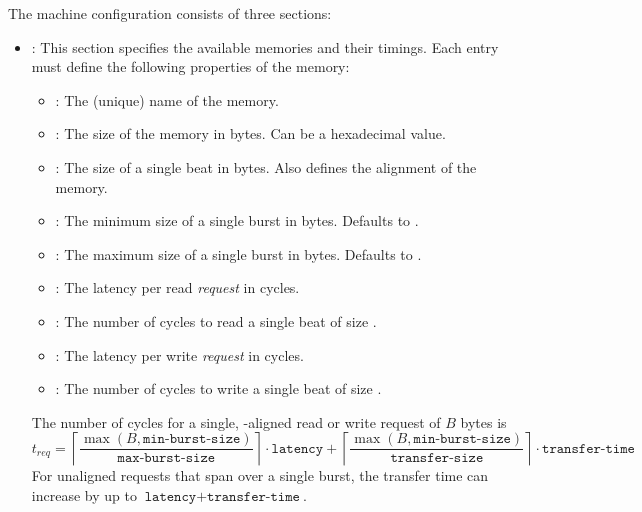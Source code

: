 The machine configuration consists of three sections:
\begin{itemize}
\item {}: This section specifies the available memories and their timings. Each entry must define
  the following properties of the memory:

  \begin{itemize}
  \item {}: The (unique) name of the memory.
  \item {}: The size of the memory in bytes. Can be a hexadecimal value.
  \item {}: The size of a single beat in bytes. Also defines the alignment of the memory.


  \item {}: The minimum size of a single burst in bytes. Defaults to .
  \item {}: The maximum size of a single burst in bytes. Defaults to .
  
  \item {}: The latency per read \emph{request} in cycles.
  \item {}: The number of cycles to read a single beat of size .
  \item {}: The latency per write \emph{request} in cycles.
  \item {}: The number of cycles to write a single beat of size .
  \end{itemize}

  The number of cycles for a single, -aligned read or write request of $B$ bytes is 
  \[
  t_{req} = \left\lceil \frac{\max(B, \texttt{min-burst-size})}{\texttt{max-burst-size}}\right\rceil \cdot \texttt{latency} +
            \left\lceil \frac{\max(B, \texttt{min-burst-size})}{\texttt{transfer-size}}\right\rceil \cdot \texttt{transfer-time}
  \]
  For unaligned requests that span over a single burst, the transfer time can increase by up to $\texttt{latency} + \texttt{transfer-time}$. 
  

\end{itemize}
